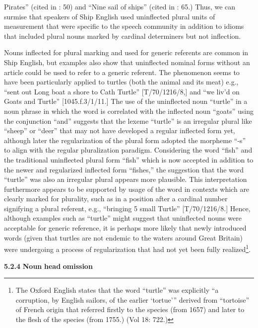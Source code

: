 Pirates” (cited in \citealt{Palmer1986}: 50) and “Nine sail of ships” (cited in \citealt{Palmer1986}: 65.) Thus, we can surmise that speakers of Ship English used uninflected plural units of measurement that were specific to the speech community in addition to idioms that included plural nouns marked by cardinal determiners but not inflection. 

Nouns inflected for plural marking and used for generic referents are common in Ship English, but examples also show that uninflected nominal forms without an article could be used to refer to a generic referent. The phenomenon seems to have been particularly applied to turtles (both the animal and its meat) e.g., “sent out Long boat a shore to Cath Turtle” [T/70/1216/8,] and “we liv’d on Goats and Turtle” [1045.f.3/1/11.] The use of the uninflected noun “turtle” in a noun phrase in which the word is correlated with the inflected noun “goats” using the conjunction “and” suggests that the lexeme “turtle” is an irregular plural like “sheep” or “deer” that may not have developed a regular inflected form yet, although later the regularization of the plural form adopted the morpheme “-s” to align with the regular pluralization paradigm. Considering the word “fish” and the traditional uninflected plural form “fish” which is now accepted in addition to the newer and regularized inflected form “fishes,” the suggestion that the word “turtle” was also an irregular plural appears more plausible. This interpretation furthermore appears to be supported by usage of the word in contexts which are clearly marked for plurality, such as in a position after a cardinal number signifying a plural referent, e.g., “bringing 5 small Turtle” [T/70/1216/8.] Hence, although examples such as “turtle” might suggest that uninflected nouns were acceptable for generic reference, it is perhaps more likely that newly introduced words (given that turtles are not endemic to the waters around Great Britain) were undergoing a process of regularization that had not yet been fully realized\footnote{The Oxford English \citet{Dictionary1989} states that the word “turtle” was explicitly “a corruption, by English sailors, of the earlier ‘tortue’” derived from “tortoise” of French origin that referred firstly to the species (from 1657) and later to the flesh of the species (from 1755.) (Vol 18: 722.)}. 

\textbf{5.2.4} \textbf{Noun} \textbf{head} \textbf{omission} 

